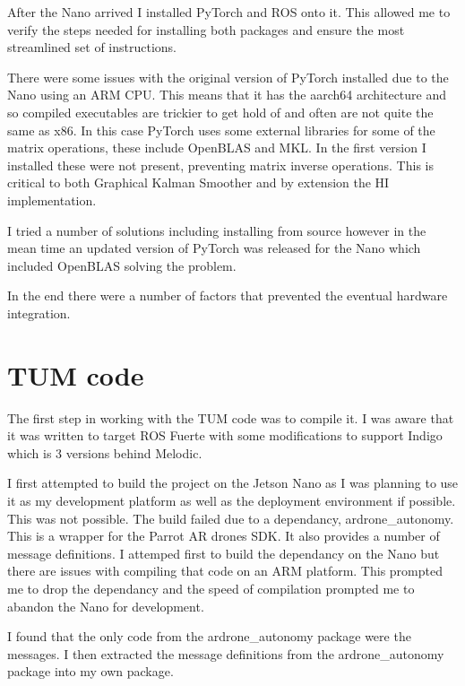 \documentclass[]{../resources/final_report}
\begin{document}
After the Nano arrived I installed PyTorch and ROS onto it. This allowed me to verify the steps 
needed for installing both packages and ensure the most streamlined set of instructions.

There were some issues with the original version of PyTorch installed due to the Nano using
an ARM CPU. This means that it has the aarch64 architecture and so compiled executables are trickier
to get hold of and often are not quite the same as x86. In this case PyTorch uses some external 
libraries for some of the matrix operations, these include OpenBLAS and MKL. In the first version 
I installed these were not present, preventing matrix inverse operations. This is critical 
to both Graphical Kalman Smoother and by extension the HI implementation.

I tried a number of solutions including installing from source however in the mean time an updated
version of PyTorch was released for the Nano which included OpenBLAS solving the problem.

In the end there were a number of factors that prevented the eventual hardware integration.



\section{TUM code}

The first step in working with the TUM code was to compile it. I was aware that it was written to 
target ROS Fuerte with some modifications to support Indigo which is 3 versions behind Melodic.

I first attempted to build the project on the Jetson Nano as I was planning to use it as my 
development platform as well as the deployment environment if possible. This was not possible. The 
build failed due to a dependancy, ardrone\_autonomy. This is a wrapper for the Parrot AR drones SDK. 
It also provides a number of message definitions. I attemped first to build the dependancy on the 
Nano but there are issues with compiling that code on an ARM platform. This prompted me to drop the 
dependancy and the speed of compilation prompted me to abandon the Nano for development.

I found that the only code from the ardrone\_autonomy package were the messages. I then extracted 
the message definitions from the ardrone\_autonomy package into my own package.
\end{document}

